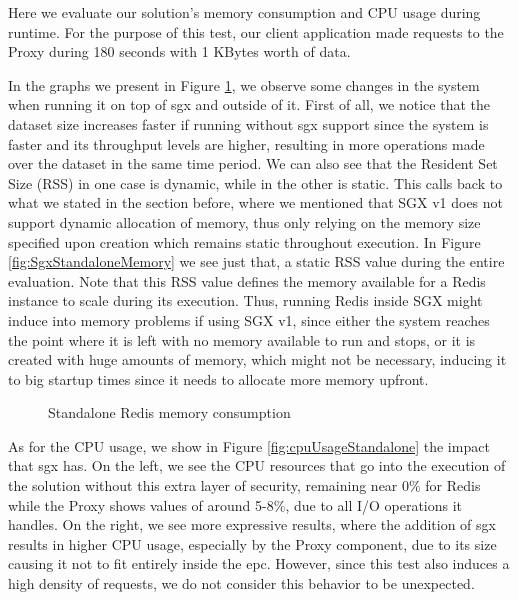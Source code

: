 Here we evaluate our solution's memory consumption and CPU usage during runtime. 
For the purpose of this test, our client application made requests to the Proxy during 180 seconds with 1 KBytes worth of data.  

In the graphs we present in Figure \ref{fig:MemoryConsumption_standalone}, we observe some changes in the system when running it on top of \gls{sgx} and outside of it. First of all, we notice that the dataset size increases faster if running without \gls{sgx} support since the system is faster and its throughput levels are higher, resulting in more operations made over the dataset in the same time period. We can also see that the Resident Set Size (RSS) in one case is dynamic, while in the other is static. This calls back to what we stated in the section before, where we mentioned that SGX v1 does not support dynamic allocation of memory, thus only relying on the memory size specified upon creation which remains static throughout execution. In Figure \ref{fig:SgxStandaloneMemory} we see just that, a static RSS value during the entire evaluation. Note that this RSS value defines the memory available for a Redis instance to scale during its execution. Thus, running Redis inside SGX might induce into memory problems if using SGX v1, since either the system reaches the point where it is left with no memory available to run and stops, or it is created with huge amounts of memory, which might not be necessary, inducing it to big startup times since it needs to allocate more memory upfront.

\begin{figure}[htbp]
	\centering
	\caption{Standalone Redis memory consumption}
	\label{fig:MemoryConsumption_standalone}
\end{figure}

As for the CPU usage, we show in Figure \ref{fig:cpuUsageStandalone} the impact that \gls{sgx} has. On the left, we see the CPU resources that go into the execution of the solution without this extra layer of security, remaining near 0\% for Redis while the Proxy shows values of around 5-8\%, due to all I/O operations it handles. On the right, we see more expressive results, where the addition of \gls{sgx} results in higher CPU usage, especially by the Proxy component, due to its size causing it not to fit entirely inside the \gls{epc}. However, since this test also induces a high density of requests, we do not consider this behavior to be unexpected.

